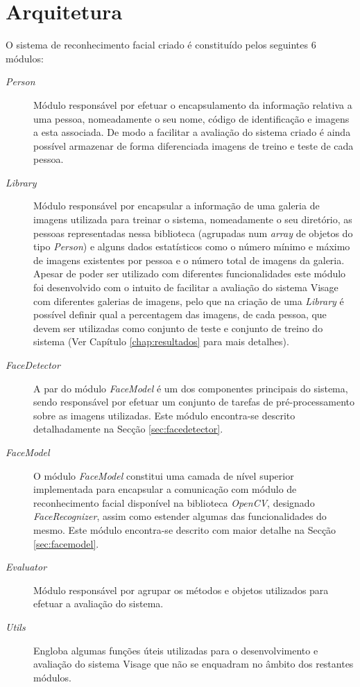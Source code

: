 \section{Arquitetura}
O sistema de reconhecimento facial criado é constituído pelos seguintes 6 módulos:

\begin{description}
\item[\textit{Person}] Módulo responsável por efetuar o encapsulamento da informação relativa a uma pessoa, nomeadamente o seu nome, código de identificação e imagens a esta associada. De modo a facilitar a avaliação do sistema criado é ainda possível armazenar de forma diferenciada imagens de treino e teste de cada pessoa.
\item[\textit{Library}]Módulo responsável por encapsular a informação de uma galeria de imagens utilizada para treinar o sistema, nomeadamente o seu diretório, as pessoas representadas nessa biblioteca (agrupadas num \textit{array} de objetos do tipo \textit{Person}) e alguns dados estatísticos como o número mínimo e máximo de imagens existentes por pessoa e o número total de imagens da galeria. Apesar de poder ser utilizado com diferentes funcionalidades este módulo foi desenvolvido com o intuito de facilitar a avaliação do sistema Visage com diferentes galerias de imagens, pelo que na criação de uma \textit{Library} é possível definir qual a percentagem das imagens, de cada pessoa, que devem ser utilizadas como conjunto de teste e conjunto de treino do sistema (Ver Capítulo \ref{chap:resultados} para mais detalhes).
\item[\textit{FaceDetector}] A par do módulo \textit{FaceModel} é um dos componentes principais do sistema, sendo responsável por efetuar um conjunto de tarefas de pré-processamento sobre as imagens utilizadas. Este módulo encontra-se descrito detalhadamente na Secção \ref{sec:facedetector}.
\item[\textit{FaceModel}] 
O módulo \textit{FaceModel} constitui uma camada de nível superior implementada para encapsular a comunicação com módulo de reconhecimento facial disponível na biblioteca \textit{OpenCV}, designado \textit{FaceRecognizer}, assim como estender algumas das funcionalidades do mesmo. Este módulo encontra-se descrito com maior detalhe na Secção \ref{sec:facemodel}.
\item[\textit{Evaluator}] Módulo responsável por agrupar os métodos e objetos utilizados para efetuar a avaliação do sistema.
\item[\textit{Utils}] Engloba algumas funções úteis utilizadas para o desenvolvimento e avaliação do sistema Visage que não se enquadram no âmbito dos restantes módulos.
\end{description}

